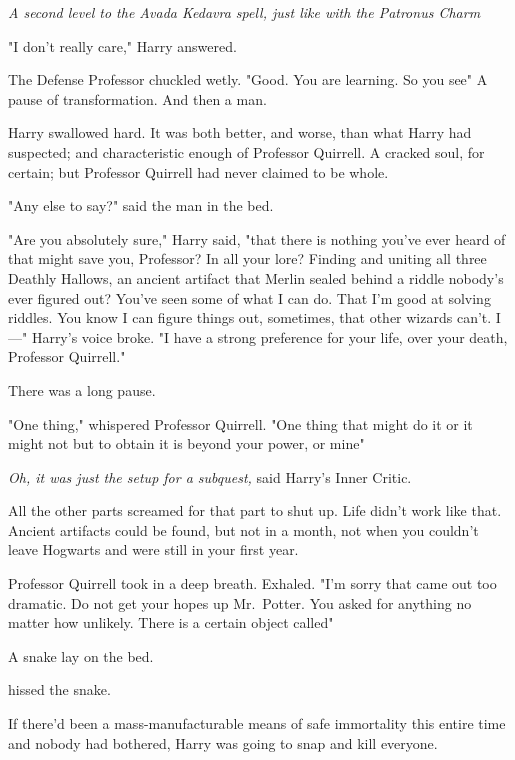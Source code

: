 \emph{A second level to the Avada Kedavra spell, just like with the Patronus
Charm{\el}}

"I don't really care," Harry answered.

The Defense Professor chuckled wetly. "Good. You are{\el} learning. So you
see{\el}" A pause of transformation.  And then a man.

Harry swallowed hard. It was both better, and worse, than what Harry had
suspected; and characteristic enough of Professor Quirrell. A cracked soul, for
certain; but Professor Quirrell had never claimed to be whole.

"Any else{\el} to say?" said the man in the bed.

"Are you absolutely sure," Harry said, "that there is nothing you've ever heard
of that might save you, Professor? In all your lore? Finding and uniting all
three Deathly Hallows, an ancient artifact that Merlin sealed behind a riddle
nobody's ever figured out? You've seen some of what I can do. That I'm good at
solving riddles. You know I can figure things out, sometimes, that other
wizards can't. I\mbox{---}" Harry's voice broke. "I have a strong preference for your
life, over your death, Professor Quirrell."

There was a long pause.

"One thing," whispered Professor Quirrell. "One thing{\el} that might do
it{\el} or it might not{\el} but to obtain it{\el} is beyond your
power, or mine{\el}"

\emph{Oh, it was just the setup for a subquest,} said Harry's Inner Critic.

All the other parts screamed for that part to shut up. Life didn't work like
that. Ancient artifacts could be found, but not in a month, not when you
couldn't leave Hogwarts and were still in your first year.

Professor Quirrell took in a deep breath. Exhaled. "I'm sorry{\el} that came
out{\el} too dramatic. Do not{\el} get your hopes up{\el} Mr.~Potter.
You asked{\el} for anything{\el} no matter how unlikely. There is{\el}
a certain object{\el} called{\el}"

A snake lay on the bed.

 hissed the snake.

If there'd been a mass-manufacturable means of safe immortality this entire
time and nobody had bothered, Harry was going to snap and kill everyone.

